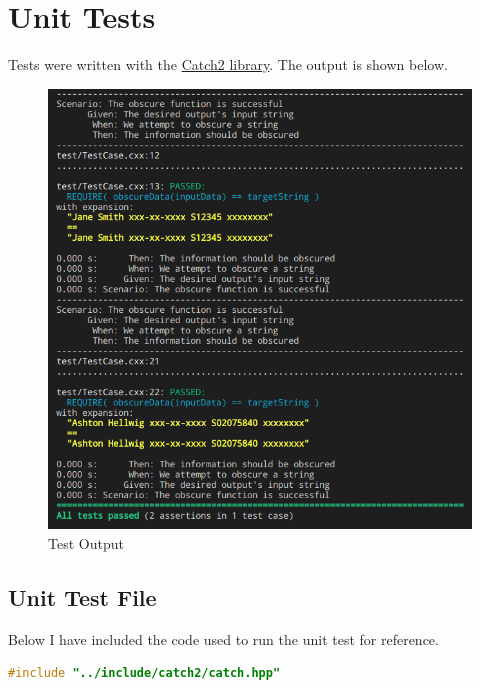 \documentclass[a4paper, 11pt]{article}
\theoremstyle{definition}
\theoremstyle{plain}
\begin{document}
  \newpage
  \section{Unit Tests}
    Tests were written with the
      \href{https://github.com/catchorg/catch}{Catch2 library}. The output is
      shown below.

    \begin{figure}[H]
      \caption{Test Output}
      \centering
      \includegraphics[width=\textwidth]{testout.png}
    \end{figure}

    \newpage
    \subsection{Unit Test File}
      Below I have included the code used to run the unit test for reference.

      \begin{lstlisting}[language=c++,caption={TestCase.cxx}]
#include "../include/catch2/catch.hpp"
      \end{lstlisting}
\end{document}
